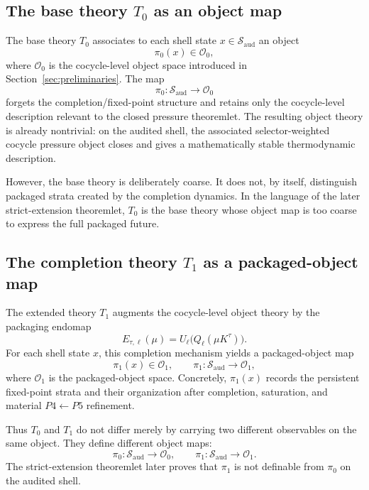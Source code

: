 \documentclass[11pt]{article}
\theoremstyle{definition}
\newcommand{\Tzero}{T_0}
\newcommand{\Tone}{T_1}
\begin{document}
\subsection{The base theory \texorpdfstring{$\Tzero$}{T0} as an object map}

The base theory \(\Tzero\) associates to each shell state \(x\in \mathcal{S}_{\mathrm{aud}}\) an object
\[
\pi_0(x)\in \mathcal{O}_0,
\]
where \(\mathcal{O}_0\) is the cocycle-level object space introduced in Section~\ref{sec:preliminaries}. The map
\[
\pi_0:\mathcal{S}_{\mathrm{aud}}\to \mathcal{O}_0
\]
forgets the completion/fixed-point structure and retains only the cocycle-level description relevant to the closed pressure theoremlet. The resulting object theory is already nontrivial: on the audited shell, the associated selector-weighted cocycle pressure object closes and gives a mathematically stable thermodynamic description.

However, the base theory is deliberately coarse. It does not, by itself, distinguish packaged strata created by the completion dynamics. In the language of the later strict-extension theoremlet, \(\Tzero\) is the base theory whose object map is too coarse to express the full packaged future.

\subsection{The completion theory \texorpdfstring{$\Tone$}{T1} as a packaged-object map}

The extended theory \(\Tone\) augments the cocycle-level object theory by the packaging endomap \cite{TsiokosCreateStone,TsiokosFoundations}
\[
E_{\tau,\ell}(\mu)=U_{\ell}\!\bigl(Q_{\ell}(\mu K^{\tau})\bigr).
\]
For each shell state \(x\), this completion mechanism yields a packaged-object map
\[
\pi_1(x)\in \mathcal{O}_1,
\qquad
\pi_1:\mathcal{S}_{\mathrm{aud}}\to \mathcal{O}_1,
\]
where \(\mathcal{O}_1\) is the packaged-object space. Concretely, \(\pi_1(x)\) records the persistent fixed-point strata and their organization after completion, saturation, and material \(P4\leftarrow P5\) refinement.

Thus \(\Tzero\) and \(\Tone\) do not differ merely by carrying two different observables on the same object. They define different object maps:
\[
\pi_0:\mathcal{S}_{\mathrm{aud}}\to \mathcal{O}_0,
\qquad
\pi_1:\mathcal{S}_{\mathrm{aud}}\to \mathcal{O}_1.
\]
The strict-extension theoremlet later proves that \(\pi_1\) is not definable from \(\pi_0\) on the audited shell.
\end{document}
